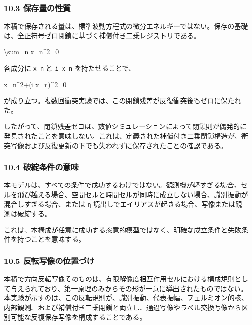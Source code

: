 \documentclass[
  a4paper,
]{article}
\newenvironment{Shaded}{}{}
\newcommand{\NormalTok}[1]{#1}
\begin{document}
\subsubsection{10.3
保存量の性質}\label{ux4fddux5b58ux91cfux306eux6027ux8cea}

本稿で保存される量は、標準波動方程式の微分エネルギーではない。保存の基礎は、全正符号ゼロ閉鎖に基づく補償付き二乗レジストリである。

\begin{Shaded}
\begin{Highlighting}[]
\NormalTok{\textbackslash{}sum\_n x\_n\^{}2=0}
\end{Highlighting}
\end{Shaded}

各成分に \texttt{x\_n} と \texttt{i\ x\_n} を持たせることで、

\begin{Shaded}
\begin{Highlighting}[]
\NormalTok{x\_n\^{}2+(i x\_n)\^{}2=0}
\end{Highlighting}
\end{Shaded}

が成り立つ。複数回衝突実験では、この閉鎖残差が反復衝突後もゼロに保たれた。

したがって、閉鎖残差ゼロは、数値シミュレーションによって閉鎖則が偶発的に発見されたことを意味しない。これは、定義された補償付き二乗閉鎖構造が、衝突写像および反復更新の下でも失われずに保存されたことの確認である。

\subsubsection{10.4
破綻条件の意味}\label{ux7834ux7dbbux6761ux4ef6ux306eux610fux5473}

本モデルは、すべての条件で成功するわけではない。観測機が軽すぎる場合、セルを飛び越える場合、空間セルと時間セルが同時に成立しない場合、識別振動が混合しすぎる場合、または
\texttt{η} 読出しでエイリアスが起きる場合、写像または観測は破綻する。

これは、本構成が任意に成功する恣意的模型ではなく、明確な成立条件と失敗条件を持つことを意味する。

\subsubsection{10.5
反転写像の位置づけ}\label{ux53cdux8ee2ux5199ux50cfux306eux4f4dux7f6eux3065ux3051}

本稿で方向反転写像そのものは、有限解像度相互作用セルにおける構成規則として与えられており、第一原理のみからその形が一意に導出されたものではない。本実験が示すのは、この反転規則が、識別振動、代表振幅、フェルミオン的核、内部観測、および補償付き二乗閉鎖と両立し、通過写像やラベル交換写像から区別可能な反復保存写像を構成することである。
\end{document}

